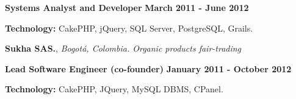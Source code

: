 \begin{outerlist}
\item[\FA \faAngleDoubleRight] \textbf{Systems Analyst and Developer} \hfill
\textbf{March 2011 - June 2012}
\end{outerlist}
% 
    \begin{innerlist}
\item \textbf{Technology:} CakePHP, jQuery, SQL Server, PostgreSQL, Grails.
    \end{innerlist}

\quarterblankline

\textbf{Sukha SAS.}, \textit{Bogot\'a, Colombia. Organic products fair-trading}

\begin{outerlist}
\item[\FA \faAngleDoubleRight] \textbf{Lead Software Engineer (co-founder)}
\hfill \textbf{January 2011 - October 2012}
\end{outerlist}

    \begin{innerlist}
\item \textbf{Technology:} CakePHP, JQuery, MySQL DBMS, CPanel.
    \end{innerlist}





%

